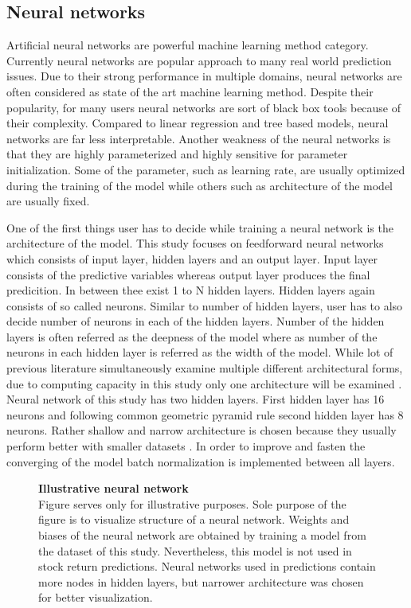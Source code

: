 \documentclass{article}
\begin{document}
\subsection{Neural networks}

Artificial neural networks are powerful machine learning method category. Currently neural networks are popular approach to many real world prediction issues. Due to their strong performance in multiple domains, neural networks are often considered as state of the art machine learning method. Despite their popularity, for many users neural networks are sort of black box tools because of their complexity. Compared to linear regression and tree based models, neural networks are far less interpretable. Another weakness of the neural networks is that they are highly parameterized and highly sensitive for parameter initialization. Some of the parameter, such as learning rate, are usually optimized during the training of the model while others such as architecture of the model are usually fixed.  \par

One of the first things user has to decide while training a neural network is the architecture of the model. This study focuses on feedforward neural networks which consists of input layer, hidden layers and an output layer. Input layer consists of the predictive variables whereas output layer produces the final predicition. In between thee exist 1 to N hidden layers. Hidden layers again consists of  so called neurons. Similar to number of hidden layers, user has to also decide number of neurons in each of the hidden layers. Number of the hidden layers is often referred as the deepness of the model where as number of the neurons in each hidden layer is referred as the width of the model. While lot of previous literature simultaneously examine multiple different architectural forms, due to computing capacity in this study only one architecture will be examined \cite{guetal, HANAUER2023, TOBEK2021100588}. Neural network of this study has two hidden layers. First hidden layer has 16 neurons and following common geometric pyramid rule second hidden layer has 8 neurons. Rather shallow and narrow architecture is chosen because they usually perform better with smaller datasets \cite{guetal}. In order to improve and fasten the converging of the model batch normalization is implemented between all layers. \par

\begin{figure}
\centering
\caption[Illustrative neural network]{\textbf{Illustrative neural network}\\  Figure serves only for illustrative purposes. Sole purpose of the figure is to visualize structure of a neural network. Weights and biases of the neural network are obtained by training a model from the dataset of this study. Nevertheless, this model is not used in stock return predictions. Neural networks used in predictions contain more nodes in hidden layers, but narrower architecture was chosen for better visualization.}

\label{plot:NN}
\end{figure}
\end{document}
